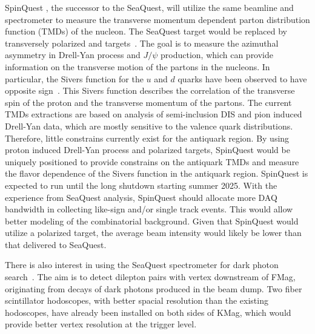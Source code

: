\documentclass[../main.tex]{subfiles}
\begin{document}
SpinQuest \cite{geesaman2014}, the successor to the SeaQuest, will utilize the same beamline and
spectrometer to measure the transverse momentum dependent parton distribution
function (TMDs) of the nucleon. The SeaQuest target would be replaced by transversely polarized 
and  targets~\cite{crabb1995}. The goal is to measure the azimuthal asymmetry in
Drell-Yan process and $J/\psi$ production, which can provide information on the
transverse motion of the partons in the nucleons.
In particular, the Sivers function for the $u$ and $d$ quarks have been observed to have
opposite sign~\cite{bacchetta2022}.
This Sivers function describes the correlation of the transverse spin of the proton
and the transverse momentum of the partons. 
The current TMDs extractions are based on analysis of semi-inclusion DIS and pion induced Drell-Yan data,
which are mostly sensitive to the valence quark distributions. 
Therefore, little constrains currently exist for the antiquark region.
By using proton induced Drell-Yan process and polarized targets, SpinQuest would be uniquely positioned to
provide constrains on the antiquark TMDs and measure the flavor dependence of the Sivers function in the antiquark region.
SpinQuest is expected to run until the long shutdown starting summer 2025. With the experience
from SeaQuest analysis, SpinQuest should allocate more DAQ bandwidth in collecting
like-sign and/or single track events. This would allow better modeling of the combinatorial
background. Given that SpinQuest would utilize a polarized target,
the average beam intensity would likely be lower than that delivered to SeaQuest.

There is also interest in using the SeaQuest spectrometer for dark photon search~\cite{apyan2022}.
The aim is to detect dilepton pairs with vertex downstream of FMag,
originating from decays of dark photons produced in the beam dump.
Two fiber scintillator hodoscopes, with better spacial resolution than the existing hodoscopes,
have already been installed on both sides of KMag,
which would provide better vertex resolution at the trigger level.
\end{document}
